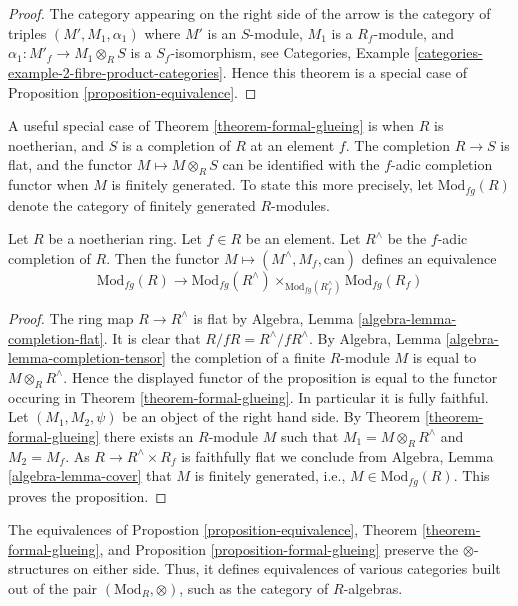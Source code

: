 \begin{proof}
The category appearing on the right side of the arrow
is the category of triples $(M', M_1, \alpha_1)$ where $M'$ is an
$S$-module, $M_1$ is a $R_f$-module, and
$\alpha_1 : M'_f \to M_1 \otimes_R S$ is a $S_f$-isomorphism, see
Categories, Example \ref{categories-example-2-fibre-product-categories}.
Hence this theorem is a special case of
Proposition \ref{proposition-equivalence}.
\end{proof}

\noindent
A useful special case of
Theorem \ref{theorem-formal-glueing}
is when $R$ is noetherian, and $S$ is a completion of $R$ at an
element $f$. The completion $R \to S$ is flat, and the functor
$M \mapsto M \otimes_R S$ can be identified with the $f$-adic
completion functor when $M$ is finitely generated. To state
this more precisely, let $\text{Mod}_{fg}(R)$ denote the category
of finitely generated $R$-modules.

\begin{proposition}
\label{proposition-formal-glueing}
Let $R$ be a noetherian ring.
Let $f \in R$ be an element.
Let $R^\wedge$ be the $f$-adic completion of $R$.
Then the functor $M \mapsto (M^\wedge, M_f, \text{can})$
defines an equivalence
$$
\text{Mod}_{fg}(R)
\longrightarrow
\text{Mod}_{fg}(R^\wedge)
\times_{\text{Mod}_{fg}(R^\wedge_f)} 
\text{Mod}_{fg}(R_f)
$$
\end{proposition}

\begin{proof}
The ring map $R \to R^\wedge$ is flat by
Algebra, Lemma \ref{algebra-lemma-completion-flat}.
It is clear that $R/fR = R^\wedge/fR^\wedge$.
By
Algebra, Lemma \ref{algebra-lemma-completion-tensor}
the completion of a finite $R$-module $M$ is equal to $M \otimes_R R^\wedge$.
Hence the displayed functor of the proposition is equal to the
functor occuring in
Theorem \ref{theorem-formal-glueing}.
In particular it is fully faithful. Let $(M_1, M_2, \psi)$ be an
object of the right hand side. By
Theorem \ref{theorem-formal-glueing}
there exists an $R$-module $M$ such that
$M_1 = M \otimes_R R^\wedge$ and $M_2 = M_f$. As $R \to R^\wedge \times R_f$
is faithfully flat we conclude from
Algebra, Lemma \ref{algebra-lemma-cover}
that $M$ is finitely generated, i.e., $M \in \text{Mod}_{fg}(R)$.
This proves the proposition.
\end{proof}

\begin{remark}
\label{remark-formal-glueing-algebras}
The equivalences of
Propostion \ref{proposition-equivalence},
Theorem \ref{theorem-formal-glueing}, and
Proposition \ref{proposition-formal-glueing}
preserve the $\otimes$-structures on either side.
Thus, it defines equivalences of various categories
built out of the pair $(\text{Mod}_R,\otimes)$, such as the category of 
$R$-algebras.
\end{remark}

